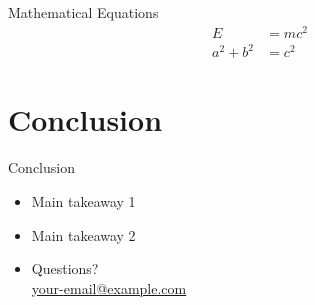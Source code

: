 \documentclass{beamer}
\begin{document}
\begin{frame}{Mathematical Equations}
    \begin{align*}
        E &= mc^2 \\
        a^2 + b^2 &= c^2
    \end{align*}
\end{frame}

\section{Conclusion}

\begin{frame}{Conclusion}
    \begin{itemize}
        \item{Main takeaway 1}
        \item{Main takeaway 2}
        \item{Questions? \\}
        \href{mailto:your{-}email@example.com}{your{-}email@example.com}  %
    \end{itemize}
\end{frame}

\begin{frame}
\end{frame}
\end{document}

